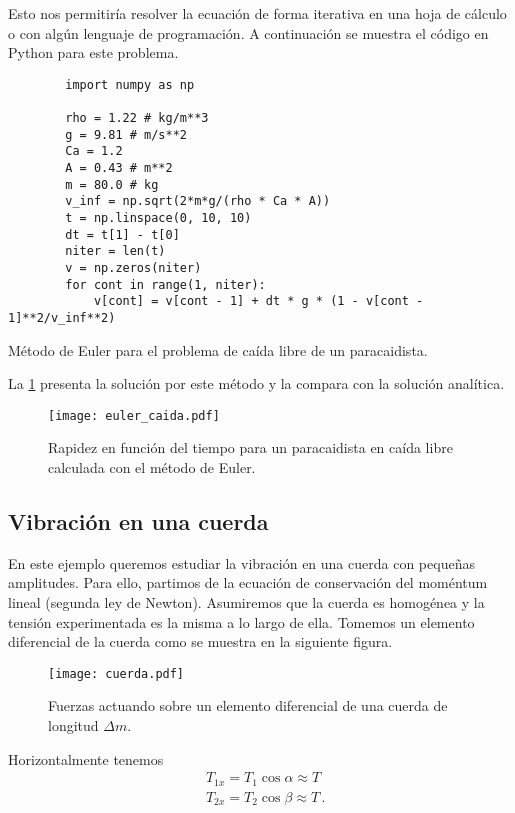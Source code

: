 Esto nos permitiría resolver la ecuación de forma iterativa en una hoja de cálculo o con algún lenguaje de programación. A continuación se muestra el código en Python para este problema.
\begin{listing}[H]
    \begin{verbatim}
        import numpy as np

        rho = 1.22 # kg/m**3
        g = 9.81 # m/s**2
        Ca = 1.2
        A = 0.43 # m**2
        m = 80.0 # kg
        v_inf = np.sqrt(2*m*g/(rho * Ca * A))
        t = np.linspace(0, 10, 10)
        dt = t[1] - t[0]
        niter = len(t)
        v = np.zeros(niter)
        for cont in range(1, niter):
            v[cont] = v[cont - 1] + dt * g * (1 - v[cont - 1]**2/v_inf**2)
    \end{verbatim}
    \caption{Método de Euler para el problema de caída libre de un paracaidista.}
    \label{lst:euler}
\end{listing}

La \cref{fig:euler_caida} presenta la solución por este método y la compara con la solución analítica.
\begin{figure}[H] 
\centering
\texttt{[image: euler\_caida.pdf]}
\caption{Rapidez en función del tiempo para un paracaidista en caída libre calculada con el método de Euler.}
\label{fig:euler_caida}
\end{figure}

\subsection{Vibración en una cuerda}
En este ejemplo queremos estudiar la vibración en una cuerda con pequeñas amplitudes. Para ello, partimos de la ecuación de conservación del moméntum lineal (segunda ley de Newton). Asumiremos que la cuerda es homogénea y la tensión experimentada es la misma a lo largo de ella. Tomemos un elemento diferencial de la cuerda como se muestra en la siguiente figura.
\begin{figure}[H] 
\centering
\texttt{[image: cuerda.pdf]}
\caption{Fuerzas actuando sobre un elemento diferencial de una cuerda de longitud \(\Delta m\).}
\label{fig:cuerda}
\end{figure}

Horizontalmente tenemos
\begin{align*}
&T_{1x} = T_1 \cos\alpha \approx T\\
&T_{2x} = T_2 \cos\beta \approx T\, .
\end{align*}

